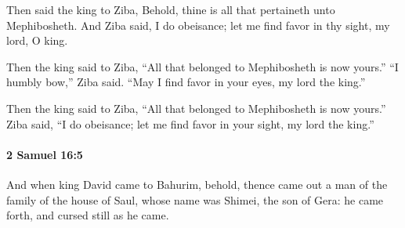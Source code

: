 			\begin{versebox}
					\item[BHS] 
					\item[ASV] Then said the king to Ziba, Behold, thine is all that pertaineth unto Mephibosheth. And Ziba said, I do obeisance; let me find favor in thy sight, my lord, O king.
					\item[NIV] Then the king said to Ziba, “All that belonged to Mephibosheth is now yours.” “I humbly bow,” Ziba said. “May I find favor in your eyes, my lord the king.”
					\item[NRSV] Then the king said to Ziba, “All that belonged to Mephibosheth is now yours.” Ziba said, “I do obeisance; let me find favor in your sight, my lord the king.”
			\end{versebox}

		\paragraph{2 Samuel 16:5} %
			\label{2SAMUEL-16-5}

			And when king David came to Bahurim, behold, thence came out a man of the family of the house of Saul, whose name was Shimei, the son of Gera: he came forth, and cursed still as he came.

